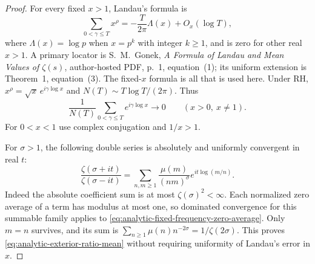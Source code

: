 \begin{proof}
For every fixed $x>1$, Landau's formula is
\[
 \sum_{0<\gamma\le T}x^\rho
      =-\frac{T}{2\pi}\Lambda(x)+O_x(\log T),
\]
where $\Lambda(x)=\log p$ when $x=p^k$ with integer $k\ge1$,
and is zero for other real $x>1$. A primary locator is
S.~M.~Gonek, \emph{A Formula of Landau and Mean Values of
$\zeta(s)$}, author-hosted PDF, p.~1, equation~(1);
its uniform extension is Theorem~1, equation~(3).
The fixed-$x$ formula is all that is used here.
Under RH, $x^\rho=\sqrt x\,e^{i\gamma\log x}$ and
$N(T)\sim T\log T/(2\pi)$. Thus
\begin{equation}\label{eq:analytic-fixed-frequency-zero-average}
 \frac1{N(T)}\sum_{0<\gamma\le T}e^{i\gamma\log x}\longrightarrow0
                    \qquad(x>0,\ x\ne1).
\end{equation}
For $0<x<1$ use complex conjugation and $1/x>1$.

For $\sigma>1$, the following double series is absolutely and
uniformly convergent in real $t$:
\[
 \frac{\zeta(\sigma+it)}{\zeta(\sigma-it)}
 =\sum_{n,m\ge1}\frac{\mu(m)}{(nm)^\sigma}
                                  e^{it\log(m/n)}.
\]
Indeed the absolute coefficient sum is at most
$\zeta(\sigma)^2<\infty$. Each normalized zero average of a
term has modulus at most one, so dominated convergence for
this summable family applies to
\eqref{eq:analytic-fixed-frequency-zero-average}.
Only $m=n$ survives, and its sum is
$\sum_{n\ge1}\mu(n)n^{-2\sigma}=1/\zeta(2\sigma)$.
This proves \eqref{eq:analytic-exterior-ratio-mean} without
requiring uniformity of Landau's error in $x$.
\end{proof}

